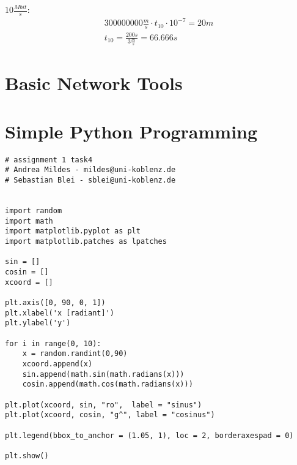 \documentclass{article}
\begin{document}
$10\frac{Mbit}{s}$:
\begin{align}
 300 000 000\frac{m}{s} \cdot t_{10} \cdot 10^{-7} = 20m\\
 t_{10} = \frac{200s}{3\frac{m}{s}} = 66.666s
\end{align}

\clearpage
\section{Basic Network Tools}

\section{Simple Python Programming}

\begin{verbatim}
# assignment 1 task4
# Andrea Mildes - mildes@uni-koblenz.de
# Sebastian Blei - sblei@uni-koblenz.de


import random
import math
import matplotlib.pyplot as plt
import matplotlib.patches as lpatches

sin = []
cosin = []
xcoord = []

plt.axis([0, 90, 0, 1])
plt.xlabel('x [radiant]')
plt.ylabel('y')

for i in range(0, 10):
    x = random.randint(0,90)
    xcoord.append(x)
    sin.append(math.sin(math.radians(x)))
    cosin.append(math.cos(math.radians(x))) 

plt.plot(xcoord, sin, "ro",  label = "sinus")
plt.plot(xcoord, cosin, "g^", label = "cosinus")

plt.legend(bbox_to_anchor = (1.05, 1), loc = 2, borderaxespad = 0)

plt.show()
\end{verbatim}
\end{document}
